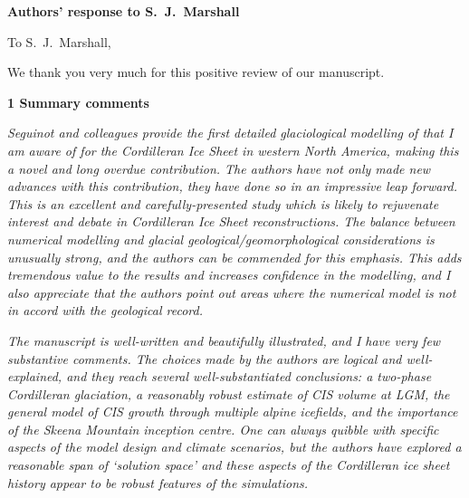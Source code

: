 


\textbf{Authors' response to S.~J.~Marshall}
\bigskip


\newcommand{\sechead}[1]{\bigskip\noindent\textbf{#1}}
\newcommand{\referee}[1]{\bigskip\textcolor{journalname}{\textit{#1}}}
\newcommand{\msquote}[1]{\begin{quote}\textit{#1}\end{quote}}
\newcommand{\doi}[1]{doi:\allowbreak\href{http://dx.doi.org/#1}{#1}}

To S.~J.~Marshall,

We thank you very much for this positive review of our manuscript.


\sechead{1 \quad Summary comments}

\referee{%
    Seguinot and colleagues provide the first detailed glaciological modelling
    of that I am aware of for the Cordilleran Ice Sheet in western North
    America, making this a novel and long overdue contribution. The authors
    have not only made new advances with this contribution, they have done so
    in an impressive leap forward. This is an excellent and carefully-presented
    study which is likely to rejuvenate interest and debate in Cordilleran Ice
    Sheet reconstructions. The balance between numerical modelling and glacial
    geological/geomorphological considerations is unusually strong, and the
    authors can be commended for this emphasis. This adds tremendous value to
    the results and increases confidence in the modelling, and I also
    appreciate that the authors point out areas where the numerical model is
    not in accord with the geological record.}

\referee{%
    The manuscript is well-written and beautifully illustrated, and I have very
    few substantive comments. The choices made by the authors are logical and
    well-explained, and they reach several well-substantiated conclusions: a
    two-phase Cordilleran glaciation, a reasonably robust estimate of CIS
    volume at LGM, the general model of CIS growth through multiple alpine
    icefields, and the importance of the Skeena Mountain inception centre. One
    can always quibble with specific aspects of the model design and climate
    scenarios, but the authors have explored a reasonable span of `solution
    space' and these aspects of the Cordilleran ice sheet history appear to be
    robust features of the simulations.}

